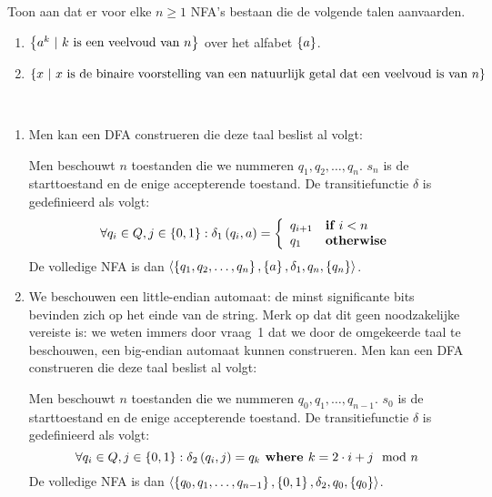 \documentclass[a4paper]{article}
\begin{document}
\begin{question}
Toon aan dat er voor elke $n \geq 1$ NFA's bestaan die de volgende talen aanvaarden.
\begin{enumerate}
  \item $\left\{ a^k\ |\ \mbox{$k$ is een veelvoud van $n$} \right\}$ over het alfabet $\left\{ a \right\}$.
  \item $\left\{ x\ |\ \mbox{$x$ is de binaire voorstelling van een natuurlijk getal dat een veelvoud is van $n$} \right\}$
\end{enumerate}
\begin{answer}~
\begin{enumerate}
 \item Men kan een DFA construeren die deze taal beslist al volgt:
 \begin{construction}
  Men beschouwt $n$ toestanden die we nummeren $q_1,q_2,\ldots,q_n$. $s_n$ is de starttoestand en de enige accepterende toestand. De transitiefunctie $\delta$ is gedefinieerd als volgt:
  \begin{equation}
   \forall q_i\in Q, j\in\left\{ 0,1 \right\}:\delta_1\left( q_i,a \right)=\left\{\begin{array}{ll} q_{i+1}&\mbox{\bf if }{i<n}\\q_{1}&\mbox{\bf otherwise} \end{array}\right.
  \end{equation}
  De volledige NFA is dan $\left\langle \left\{ q_1,q_2,\ldots,q_n \right\},\left\{ a \right\},\delta_1,q_n,\left\{ q_n \right\} \right\rangle$.
 \end{construction}
 \item We beschouwen een little-endian automaat: de minst significante bits bevinden zich op het einde van de string. Merk op dat dit geen noodzakelijke vereiste is: we weten immers door vraag~1 dat we door de omgekeerde taal te beschouwen, een big-endian automaat kunnen construeren. Men kan een DFA construeren die deze taal beslist al volgt:
 \begin{construction}
  Men beschouwt $n$ toestanden die we nummeren $q_0,q_1,\ldots,q_{n-1}$. $s_0$ is de starttoestand en de enige accepterende toestand. De transitiefunctie $\delta$ is gedefinieerd als volgt:
  \begin{equation}
   \forall q_i\in Q, j\in\left\{ 0,1 \right\}:\delta_2\left( q_i,j \right)=q_k\mbox{\bf{ where }} k=2\cdot i+j\mod n
  \end{equation}
  De volledige NFA is dan $\left\langle \left\{ q_0,q_1,\ldots,q_{n-1} \right\},\left\{ 0,1 \right\},\delta_2,q_0,\left\{ q_0 \right\} \right\rangle$.
 \end{construction}
\end{enumerate}
\end{answer}
\end{question}
\end{document}
